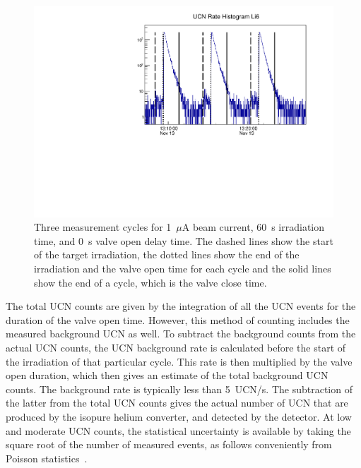\begin{figure}[h!]
  \centering
  \includegraphics[width=1.0\textwidth]{UCNRate_with_lines_logy.pdf}
  \caption{Three measurement cycles for 1~$\mu$A beam current, 60~s
    irradiation time, and 0~s valve open delay time. The dashed lines
    show the start of the target irradiation, the dotted lines show
    the end of the irradiation and the valve open time for each cycle
    and the solid lines show the end of a cycle, which is the valve
    close time.}
  \label{fig:UCNRate_with_lines}
\end{figure}

The total UCN counts are given by the integration of all the UCN
events for the duration of the valve open time. However, this method
of counting includes the measured background UCN as well. To subtract
the background counts from the actual UCN counts, the UCN background
rate is calculated before the start of the irradiation of that
particular cycle. This rate is then multiplied by the valve open
duration, which then gives an estimate of the total background UCN
counts. The background rate is typically less than 5~UCN/s. The
subtraction of the latter from the total UCN counts gives the actual
number of UCN that are produced by the isopure helium converter, and
detected by the detector. At low and moderate UCN counts, the
statistical uncertainty is available by taking the square root of the
number of measured events, as follows conveniently from Poisson
statistics~\cite{pomme2015uncertainty}.
